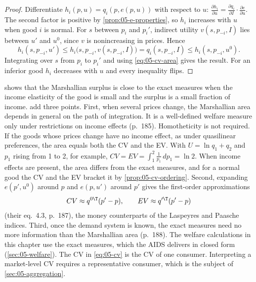 \begin{proof}
Differentiate $h_i(p, u) = q_i(p, e(p, u))$ with respect to $u$:
$\frac{\partial h_i}{\partial u} = \frac{\partial q_i}{\partial I}\cdot\frac{\partial e}{\partial u}$. The
second factor is positive by \cref{prop:05-e-properties}, so $h_i$ increases with $u$ when good $i$ is normal.
For $s$ between $p_i$ and $p_i'$, indirect utility $v(s, p_{-i}, I)$ lies between $u'$ and $u^0$, since $v$
is nonincreasing in prices. Hence
\begin{equation*}
h_i(s, p_{-i}, u') \leq h_i\big(s, p_{-i}, v(s, p_{-i}, I)\big) = q_i(s, p_{-i}, I) \leq h_i(s, p_{-i}, u^0).
\end{equation*}
Integrating over $s$ from $p_i$ to $p_i'$ and using \eqref{eq:05-cv-area} gives the result. For an inferior
good $h_i$ decreases with $u$ and every inequality flips.
\end{proof}

\citet{Willig1976} shows that the Marshallian surplus is close to the exact measures when the income
elasticity of the good is small and the surplus is a small fraction of income.
\citet[\S 7.4, pp.~184--188]{DeatonMuellbauer1980b} add three points. First, when several prices change,
the Marshallian area depends in general on the path of integration. It is a well-defined welfare measure only under
restrictions on income effects (p.~185). Homotheticity is not required. If the goods whose prices change have no income
effect, as under quasilinear preferences, the area equals both the CV and the EV. With $U = \ln q_1 + q_2$ and $p_1$
rising from 1 to 2, for example, $CV = EV = \int_1^2 \frac{1}{p_1}\,dp_1 = \ln 2$. When income effects are present, the
area differs from the exact measures, and for a normal good the CV and the EV bracket it by \cref{prop:05-cv-ordering}.
Second, expanding $e(p', u^0)$ around $p$ and $e(p, u')$ around $p'$ gives the first-order
approximations
\begin{equation*}
  CV \approx q^{0\T}(p' - p), \qquad EV \approx q'^{\T}(p' - p)
\end{equation*}
(their eq.~4.3, p.~187), the money counterparts of the Laspeyres and Paasche indices. Third, once the
demand system is known, the exact measures need no more information than the Marshallian area (p.~188).
The welfare
calculations in this chapter use the exact measures, which the AIDS delivers in closed form
(\cref{sec:05-welfare}). The CV in \eqref{eq:05-cv} is the CV of one consumer. Interpreting a market-level
CV requires a representative consumer, which is the subject of \cref{sec:05-aggregation}.


